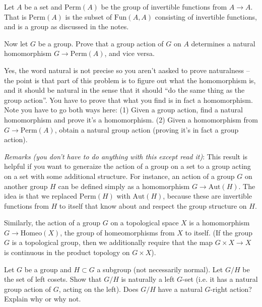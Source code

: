 \documentclass[12pt]{article}
\begin{document}
\begin{problem}{4}
Let $A$ be a set and $\text{Perm}(A)$ be the group of invertible functions from
$A\to A$. That is $\text{Perm}(A)$ is the subset of $\text{Fun}(A,A)$ consisting
of invertible functions, and is a group as discussed in the notes.

Now let $G$ be a group. Prove that a group action of $G$ on $A$ determines a
natural homomorphism $G\to \text{Perm}(A)$, and vice versa.

Yes, the word natural is not precise so you aren't aasked to prove naturalness
-- the point is that part of this problem is to figure out what the homomorphism
is, and it should be natural in the sense that it should ``do the same thing as
the group action''. You have to prove that what you find is in fact a
homomorphism. Note you have to go both ways here: (1) Given a group action, find
a natural homomorphism and prove it's a homomorphism. (2) Given a homomorphism
from $G\to\text{Perm}(A)$, obtain a natural group action (proving it's in fact a
group action).

\textit{Remarks (you don't have to do anything with this except read it)}: This
result is helpful if you want to generaize the action of a group on a set to a
group acting on a set with some additional structure. For instance, an action of
a group $G$ on another group $H$ can be defined simply as a homomorphism
$G\to\text{Aut}(H)$. The idea is that we replaced $\text{Perm}(H)$ with
$\text{Aut}(H)$, because these are invertible functions from $H$ to itself that
know about and respect the group structure on $H$.

Similarly, the action of a group $G$ on a topological space $X$ is a
homomorphism $G\to\text{Homeo}(X)$, the group of homeomorphisms from $X$ to
itself. (If the group $G$ is a topological group, then we additionally require
that the map $G\times X\to X$ is continuous in the product topology on $G\times
X$).
\begin{solution}
\end{solution}
\end{problem}
\begin{problem}{5}
Let $G$ be a group and $H\subset G$ a subgroup (not necessarily normal). Let
$G/H$ be the set of left cosets. Show that $G/H$ is naturally a left $G$-set
(i.e. it has a natural group action of $G$, acting on the left). Does $G/H$ have
a natural $G$-right action? Explain why or why not.
\begin{solution}
\end{solution}
\end{problem}
\end{document}
